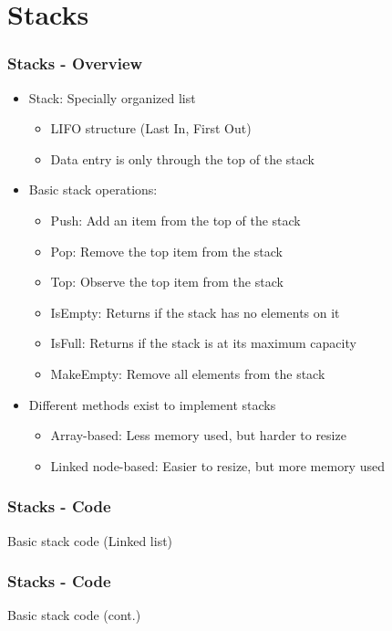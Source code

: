 \section{Stacks}
\begin{frame}\frametitle{Stacks - Overview}
\begin{itemize}
\item Stack: Specially organized list
	\begin{itemize}
	\item LIFO structure (Last In, First Out)
	\item Data entry is only through the top of the stack
	\end{itemize}
\item Basic stack operations:
\begin{itemize}
\item Push: Add an item from the top of the stack
\item Pop: Remove the top item from the stack
\item Top: Observe the top item from the stack
\item IsEmpty: Returns if the stack has no elements on it
\item IsFull: Returns if the stack is at its maximum capacity
\item MakeEmpty: Remove all elements from the stack
\end{itemize}
\item Different methods exist to implement stacks
	\begin{itemize}
	\item Array-based: Less memory used, but harder to resize
	\item Linked node-based: Easier to resize, but more memory used
	\end{itemize}
\end{itemize}
\end{frame}

\begin{frame}\frametitle{Stacks - Code}
Basic stack code (Linked list)

%
\end{frame}

\begin{frame}\frametitle{Stacks - Code}
Basic stack code (cont.)

\end{frame}

